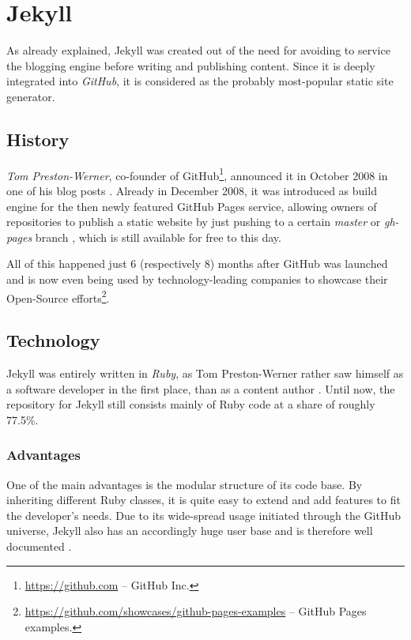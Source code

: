 \section{Jekyll}
\label{sec:jekyll}

As already explained, Jekyll was created out of the need for avoiding to service the blogging engine before writing and publishing content. Since it is deeply integrated into \emph{GitHub}, it is considered as the probably most-popular static site generator.

\subsection{History}
\label{sec:jekyll-history}
\emph{Tom Preston-Werner}, co-founder of GitHub\footnote{\url{https://github.com} -- GitHub Inc.}, announced it in October 2008 in one of his blog posts \cite{PrestonWerner2008jekyll}. Already in December 2008, it was introduced as build engine for the then newly featured GitHub Pages service, allowing owners of repositories to publish a static website by just pushing to a certain \emph{master} or \emph{gh-pages} branch \cite{PrestonWerner2008githubpages}, which is still available for free to this day.

All of this happened just 6 (respectively 8) months after GitHub was launched \cite{PrestonWerner2008githublaunch} and is now even being used by technology-leading companies to showcase their Open-Source efforts\footnote{\url{https://github.com/showcases/github-pages-examples} -- GitHub Pages examples.}.

\subsection{Technology}
\label{sec:jekyll-technology}
Jekyll was entirely written in \emph{Ruby}, as Tom Preston-Werner rather saw himself as a software developer in the first place, than as a content author \cite{PrestonWerner2008jekyll}. Until now, the repository for Jekyll still consists mainly of Ruby code at a share of roughly 77.5\%.

\subsubsection{Advantages}
One of the main advantages is the modular structure of its code base. By inheriting different Ruby classes, it is quite easy to extend and add features to fit the developer's needs. Due to its wide-spread usage initiated through the GitHub universe, Jekyll also has an accordingly huge user base and is therefore well documented \cite[26]{dhillon2016}.

